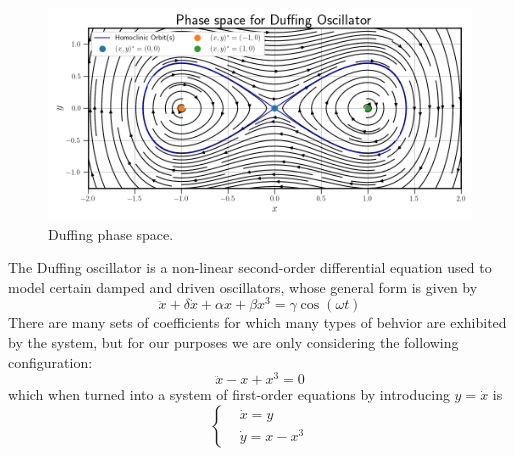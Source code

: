 \begin{figure}[!ht]
    \centering
    \begin{minipage}{\textwidth}
        \includegraphics[width=\textwidth]{"../Figures/duffing_phase_space.png"}
    \end{minipage}
    \caption{Duffing phase space.}
    \label{fig:duffing phase space}
\end{figure}

The Duffing oscillator is a non-linear second-order differential equation used to model 
certain damped and driven oscillators, whose general form is given by
\begin{equation}
    \ddot{x} + \delta\dot{x} + \alpha x + \beta x^3 = \gamma\cos(\omega t)
\end{equation}
There are many sets of coefficients for which many types of behvior are exhibited by the
system, but for our purposes we are only considering the following configuration:
\begin{equation}
    \ddot{x} - x + x^3 = 0
\end{equation}
which when turned into a system of first-order equations by introducing $y = \dot{x}$ is
\begin{equation}
    \begin{cases}
        & \dot{x} = y \\
        & \dot{y} = x - x^3  
    \end{cases}
\end{equation}

